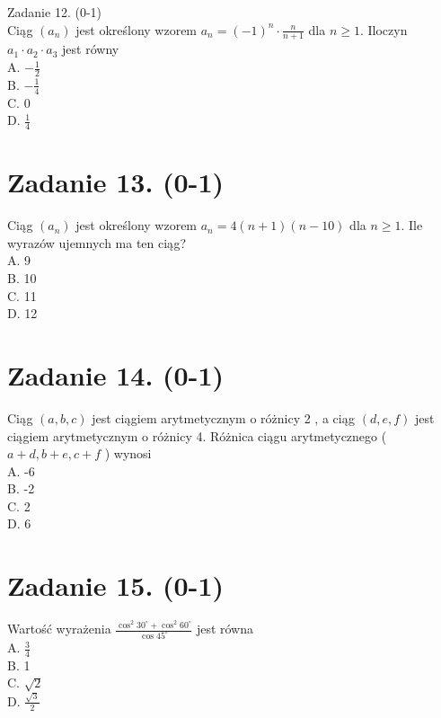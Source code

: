 \documentclass[10pt]{article}
\begin{document}
Zadanie 12. (0-1)\\
Ciąg \(\left(a_{n}\right)\) jest określony wzorem \(a_{n}=(-1)^{n} \cdot \frac{n}{n+1}\) dla \(n \geqslant 1\). Iloczyn \(a_{1} \cdot a_{2} \cdot a_{3}\) jest równy\\
A. \(-\frac{1}{2}\)\\
B. \(-\frac{1}{4}\)\\
C. 0\\
D. \(\frac{1}{4}\)

\section*{Zadanie 13. (0-1)}
Ciąg \(\left(a_{n}\right)\) jest określony wzorem \(a_{n}=4(n+1)(n-10)\) dla \(n \geqslant 1\). Ile wyrazów ujemnych ma ten ciąg?\\
A. 9\\
B. 10\\
C. 11\\
D. 12

\section*{Zadanie 14. (0-1)}
Ciąg \((a, b, c)\) jest ciągiem arytmetycznym o różnicy 2 , a ciąg \((d, e, f)\) jest ciągiem arytmetycznym o różnicy 4. Różnica ciągu arytmetycznego ( \(a+d, b+e, c+f\) ) wynosi\\
A. -6\\
B. -2\\
C. 2\\
D. 6

\section*{Zadanie 15. (0-1)}
Wartość wyrażenia \(\frac{\cos ^{2} 30^{\circ}+\cos ^{2} 60^{\circ}}{\cos 45^{\circ}}\) jest równa\\
A. \(\frac{3}{4}\)\\
B. 1\\
C. \(\sqrt{2}\)\\
D. \(\frac{\sqrt{3}}{2}\)
\end{document}
